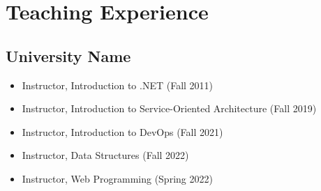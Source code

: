 \documentclass{cv_style}
\begin{document}
		
	\section{Teaching Experience}
		\subsection{University Name}
		\begin{itemize}
			\item Instructor, Introduction to .NET (Fall 2011)
			\item Instructor, Introduction to Service-Oriented Architecture (Fall 2019)
			\item Instructor, Introduction to DevOps (Fall 2021)
			\item Instructor, Data Structures (Fall 2022)
			\item Instructor, Web Programming (Spring 2022)
		\end{itemize}
		
		
\end{document}
